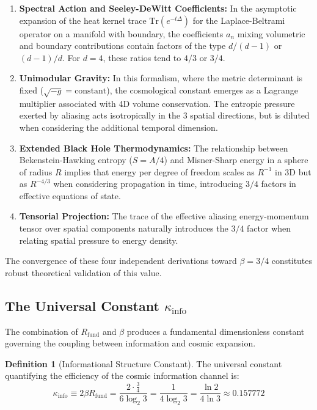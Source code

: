 \documentclass[11pt, a4paper]{article}
\theoremstyle{plain}
\theoremstyle{definition}
\newtheorem{definition}[theorem]{Definition}
\newcommand{\Rfactor}{R_{\text{fund}}}
\newcommand{\Kinfo}{\kappa_{\text{info}}}
\begin{document}
\begin{enumerate}
    \item \textbf{Spectral Action and Seeley-DeWitt Coefficients:} In the asymptotic expansion of the heat kernel trace $\text{Tr}(e^{-t\Delta})$ for the Laplace-Beltrami operator on a manifold with boundary, the coefficients $a_n$ mixing volumetric and boundary contributions contain factors of the type $d/(d-1)$ or $(d-1)/d$. For $d=4$, these ratios tend to $4/3$ or $3/4$.
    
    \item \textbf{Unimodular Gravity:} In this formalism, where the metric determinant is fixed ($\sqrt{-g} = \text{constant}$), the cosmological constant emerges as a Lagrange multiplier associated with 4D volume conservation. The entropic pressure exerted by aliasing acts isotropically in the 3 spatial directions, but is diluted when considering the additional temporal dimension.
    
    \item \textbf{Extended Black Hole Thermodynamics:} The relationship between Bekenstein-Hawking entropy ($S = A/4$) and Misner-Sharp energy in a sphere of radius $R$ implies that energy per degree of freedom scales as $R^{-1}$ in 3D but as $R^{-4/3}$ when considering propagation in time, introducing $3/4$ factors in effective equations of state.
    
    \item \textbf{Tensorial Projection:} The trace of the effective aliasing energy-momentum tensor over spatial components naturally introduces the $3/4$ factor when relating spatial pressure to energy density.
\end{enumerate}

The convergence of these four independent derivations toward $\beta = 3/4$ constitutes robust theoretical validation of this value.

\subsection{The Universal Constant \texorpdfstring{$\Kinfo$}{κ\_info}}

The combination of $\Rfactor$ and $\beta$ produces a fundamental dimensionless constant governing the coupling between information and cosmic expansion.

\begin{definition}[Informational Structure Constant]
The universal constant quantifying the efficiency of the cosmic information channel is:
\begin{equation}
\boxed{\Kinfo \equiv 2\beta\Rfactor = \frac{2 \cdot \frac{3}{4}}{6 \log_2 3} = \frac{1}{4 \log_2 3} = \frac{\ln 2}{4 \ln 3} \approx 0.157772}
\label{eq:kinfo_def}
\end{equation}
\end{definition}
\end{document}
